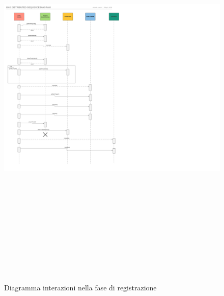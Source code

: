 \documentclass[10pt,a4paper]{article}
\begin{document}
\begin{figure}[H]
\begin{center}
\includegraphics[height=20cm, keepaspectratio]{registration.png}
\caption{Diagramma interazioni nella fase di registrazione}
\end{center}
\end{figure}
\end{document}
